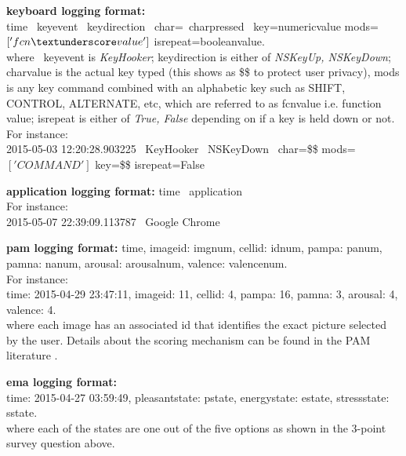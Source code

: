 \documentclass{article}
\begin{document}
\textbf{keyboard logging format:}\\
time
	\textpipe \  key\textunderscore event  
	\textpipe  \  key\textunderscore direction
	\textpipe \ char=\  char\textunderscore pressed \ 
    key=numeric\textunderscore value
     mods=$['fcn\textunderscore value']$
    is\textunderscore repeat=boolean\textunderscore value.\\
    \newline
    where \  key\textunderscore event is \textit{KeyHooker};  key\textunderscore direction is either of \textit{NSKeyUp, NSKeyDown}; char\textunderscore value is the actual key typed (this shows as \$\$ to protect user privacy), mods is any key command combined with an alphabetic key such as SHIFT, CONTROL, ALTERNATE, etc, which are referred to as fcn\textunderscore value i.e. function value;  is\textunderscore repeat is either of \textit{True, False} depending on if a key is held down or not.\\
    
 For instance: \\
2015-05-03 12:20:28.903225 
        \textpipe \ KeyHooker               
        \textpipe \ NSKeyDown 
        \textpipe \ char=\$\$ 
        mods=$['COMMAND']$
         key=\$\$ 
         is\textunderscore repeat=False
         
\textbf{application logging format:}
time \textpipe \  application  \\

For instance:\\
2015-05-07 22:39:09.113787 \textpipe  \  Google Chrome

\textbf{pam logging format:}
time, 
image\textunderscore id: img\textunderscore num, 
cell\textunderscore id: id\textunderscore num, 
pam\textunderscore pa: pa\textunderscore num, 
pam\textunderscore na: na\textunderscore num, 
arousal: arousal\textunderscore num, 
valence: valence\textunderscore num. \\

For instance: \\
time: 2015-04-29 23:47:11, image\textunderscore id: 11, cell\textunderscore id: 4, pam\textunderscore pa: 16, pam\textunderscore na: 3, arousal: 4, valence: 4. \\
where each image has an associated id that identifies the exact picture selected by the user. Details about the scoring mechanism can be found in the PAM literature \cite{pollak2011pam}.

\textbf{ema logging format:}\\
time: 2015-04-27 03:59:49, pleasant\textunderscore state: p\textunderscore state, energy\textunderscore state: e\textunderscore state, stress\textunderscore state: s\textunderscore state. \\
where each of the states are one out of the five options as shown in the 3-point survey question above. 
\end{document}

